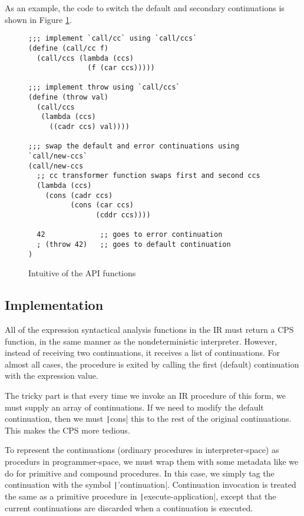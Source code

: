 \documentclass[]{article}
\begin{document}
As an example, the code to switch the default and secondary continuations is shown in Figure \ref{fig:demo}.

\begin{figure}
  \centering
\begin{verbatim}
;;; implement `call/cc` using `call/ccs`
(define (call/cc f)
  (call/ccs (lambda (ccs)
              (f (car ccs)))))

;;; implement throw using `call/ccs`
(define (throw val)
  (call/ccs
   (lambda (ccs)
     ((cadr ccs) val))))

;;; swap the default and error continuations using `call/new-ccs`
(call/new-ccs
  ;; cc transformer function swaps first and second ccs
  (lambda (ccs)
    (cons (cadr ccs)
          (cons (car ccs)
                (cddr ccs))))

  42             ;; goes to error continuation
  ; (throw 42)   ;; goes to default continuation
)
\end{verbatim}
  \caption{Intuitive of the API functions}
  \label{fig:demo}
\end{figure}

\subsection{Implementation}
\label{sec:arch}

All of the expression syntactical analysis functions in the IR must return a CPS function, in the same manner as the nondeterministic interpreter. However, instead of receiving two continuations, it receives a list of continuations. For almost all cases, the procedure is exited by calling the first (default) continuation with the expression value.

The tricky part is that every time we invoke an IR procedure of this form, we must supply an array of continuations. If we need to modify the default continuation, then we must \texttt|cons| this to the rest of the original continuations. This makes the CPS more tedious.

To represent the continuations (ordinary procedures in interpreter-space) as procedurs in programmer-space, we must wrap them with some metadata like we do for primitive and compound procedures. In this case, we simply tag the continuation with the symbol \texttt|'continuation|. Continuation invocation is treated the same as a primitive procedure in \texttt|execute-application|, except that the current continuations are discarded when a continuation is executed.
\end{document}
